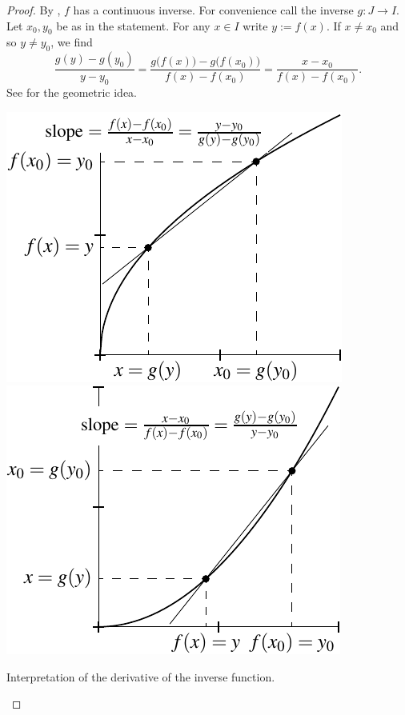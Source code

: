 \begin{proof}
By , $f$ has a continuous inverse.  For convenience
call the inverse $g \colon J \to I$.
Let $x_0,y_0$ be as in the statement.  For any $x \in I$ write $y := f(x)$.
If $x \not= x_0$ and so $y \not= y_0$, we find
\begin{equation*}
\frac{g(y)-g(y_0)}{y-y_0} =
\frac{g\bigl(f(x)\bigr)-g\bigl(f(x_0)\bigr)}{f(x)-f(x_0)} =
\frac{x-x_0}{f(x)-f(x_0)} .
\end{equation*}
See  for the geometric idea.
\begin{myfigureht}
\includegraphics{figures/inversefigA}
\quad
\includegraphics{figures/inversefigB}
\caption{Interpretation of the derivative of the inverse
function.\label{inversefig}}
\end{myfigureht}


\end{proof}
